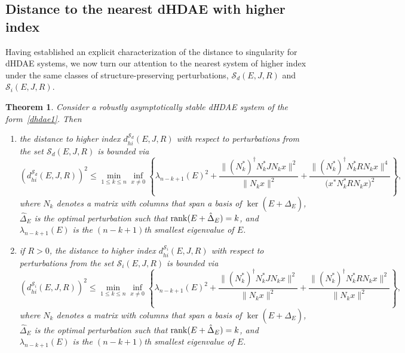 \documentclass[11pt]{article}
\newtheorem{theorem}{Theorem}
\newcommand{\rank}     {\mathop{\rm rank}\nolimits}
\begin{document}
\subsection{Distance to the nearest dHDAE with higher index}\label{sec:disthi}
Having established an explicit characterization of the distance to singularity for dHDAE systems,
we now turn our attention to the nearest system of higher index
under the same classes of structure-preserving perturbations, $ {\mathcal S_d}(E,J,R)$ and ${\mathcal S_i}(E,J,R).$

\begin{theorem}\label{thm:dist-hiEJR}
    Consider a robustly asymptotically stable dHDAE system of the form~\eqref{dhdae1}. Then
    \begin{enumerate}
        \item the distance to higher index $d_{hi}^{\mathcal S_d}(E,J,R)$ with respect to perturbations from the set $\mathcal S_{d}(E,J,R)$ is bounded via
        \begin{equation}
            (d_{hi}^{\mathcal S_d}(E,J,R))^2 \leq \min_{1 \leq k \leq n} \inf_{x\neq 0} \left\{ \lambda_{n-k+1}(E)^2 + \frac{\|(N_k^*)^{\dagger} N_k^* J N_k x\|^2}{\|N_k x\|^2} + \frac{\|(N_k^*)^{\dagger} N_k^* R N_k x\|^4} {\big(x^* N_k^* R N_k x\big)^2} \right\},
        \end{equation}
        where $N_k$ denotes a  matrix with  columns that span a basis of $\ker(E+\hat \Delta_E)$, $\hat \Delta_E$ is the optimal perturbation such that $\rank (E+\hat \Delta_E)=k$,
         and $\lambda_{n-k+1}(E)$ is the $(n-k+1)$th smallest eigenvalue of $E$.
        \item if $R>0$, the distance to higher index $d_{hi}^{\mathcal S_i}(E,J,R)$ with respect to perturbations from the set $\mathcal S_{i}(E,J,R)$ is bounded via
        \begin{equation}
            (d_{hi}^{\mathcal S_i}(E,J,R))^2 \leq \min_{1\leq k \leq n}\inf_{x\neq 0} \left\{ \lambda_{n-k+1}(E)^2 + \frac{\|(N_k^*)^{\dagger} N_k^* J N_k x\|^2}{\|N_k x\|^2} + \frac{\|(N_k^*)^{\dagger} N_k^* R N_k x\|^2} {\|N_k x\|^2} \right\},
        \end{equation}
        where $N_k$ denotes a  matrix with  columns that span a basis of $\ker(E+\hat \Delta_E)$, $\hat \Delta_E$ is the optimal perturbation such that $\rank (E+\hat \Delta_E)=k$, and $\lambda_{n-k+1}(E)$ is the $(n-k+1)$th smallest eigenvalue of $E$.
    \end{enumerate}
\end{theorem}
\end{document}
